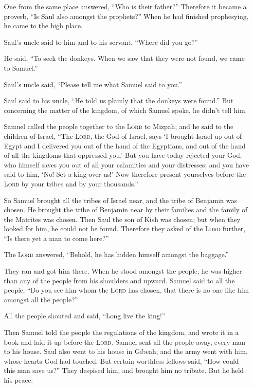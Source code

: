  One from the same place answered, ``Who is their
father?'' Therefore it became a proverb, ``Is Saul also amongst the
prophets?''  When he had finished prophesying, he came to
the high place.

 Saul's uncle said to him and to his servant, ``Where did
you go?''

He said, ``To seek the donkeys. When we saw that they were not found, we
came to Samuel.''

 Saul's uncle said, ``Please tell me what Samuel said to
you.''

 Saul said to his uncle, ``He told us plainly that the
donkeys were found.'' But concerning the matter of the kingdom, of which
Samuel spoke, he didn't tell him.

 Samuel called the people together to the \textsc{Lord}
to Mizpah;  and he said to the children of Israel, ``The
\textsc{Lord}, the God of Israel, says `I brought Israel up out of Egypt
and I delivered you out of the hand of the Egyptians, and out of the
hand of all the kingdoms that oppressed you.'  But you
have today rejected your God, who himself saves you out of all your
calamities and your distresses; and you have said to him, `No! Set a
king over us!' Now therefore present yourselves before the \textsc{Lord}
by your tribes and by your thousands.''

 So Samuel brought all the tribes of Israel near, and the
tribe of Benjamin was chosen.  He brought the tribe of
Benjamin near by their families and the family of the Matrites was
chosen. Then Saul the son of Kish was chosen; but when they looked for
him, he could not be found.  Therefore they asked of the
\textsc{Lord} further, ``Is there yet a man to come here?''

The \textsc{Lord} answered, ``Behold, he has hidden himself amongst the
baggage.''

 They ran and got him there. When he stood amongst the
people, he was higher than any of the people from his shoulders and
upward.  Samuel said to all the people, ``Do you see him
whom the \textsc{Lord} has chosen, that there is no one like him amongst
all the people?''

All the people shouted and said, ``Long live the king!''

 Then Samuel told the people the regulations of the
kingdom, and wrote it in a book and laid it up before the \textsc{Lord}.
Samuel sent all the people away, every man to his house. 
Saul also went to his house in Gibeah; and the army went with him, whose
hearts God had touched.  But certain worthless fellows
said, ``How could this man save us?'' They despised him, and brought him
no tribute. But he held his peace.

